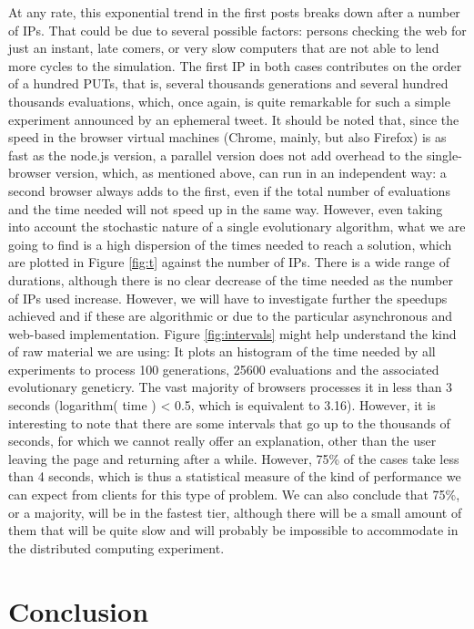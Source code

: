 \documentclass{sig-alternate}
\begin{document}
At any rate, this exponential trend in the first posts breaks down
after a number of IPs. That could be due to several possible factors:
persons checking the web for just an instant, late comers, or very
slow computers that are not able to lend more cycles to the
simulation. The first IP in both cases contributes on the order of a
hundred PUTs, that is, several thousands generations and several
hundred thousands evaluations, which, once again, is quite remarkable
for such a simple experiment announced by an ephemeral tweet. It
should be noted that, since the speed in the browser virtual machines
(Chrome, mainly, but also Firefox) is as fast as the node.js version,
a parallel version does not add overhead to the single-browser
version, which, as mentioned above, can run in an independent
way: a second browser always adds to the first, even if the total
number of evaluations and the time needed will not speed up in the
same way. However, even taking into account the stochastic nature of a
single evolutionary algorithm, what we are going to find is a high
dispersion of the times needed to reach a solution, which are plotted
in Figure \ref{fig:t} against the number of IPs. There is a wide
range of durations, although there is no clear decrease of the time
needed as the number of IPs used increase. However, we will have to
investigate further the speedups achieved and if these are %
algorithmic or due to the particular asynchronous and web-based
implementation. Figure \ref{fig:intervals} might help understand the
kind of raw material we are using: It plots an histogram of the time
needed by all experiments to process 100 generations, 25600
evaluations and the associated evolutionary geneticry. The vast %
majority of browsers processes it in less than 3 seconds (logarithm( 
time ) < 0.5, which is equivalent to 3.16). However, it is interesting
to note that there are some intervals that go up to the thousands of
seconds, for which we cannot really offer an explanation, other than
the user leaving the page and returning after a while. However, 75\%
of the cases take less than 4 seconds, which is thus a statistical
measure of the kind of performance we can expect from clients for this
type of problem. We can also conclude that 75\%, or a majority, will
be in the fastest tier, although there will be a small amount of them
that will be quite slow and will probably be impossible to accommodate
in the distributed computing experiment.

\section{Conclusion}
\label{sec:conc}
\end{document}
